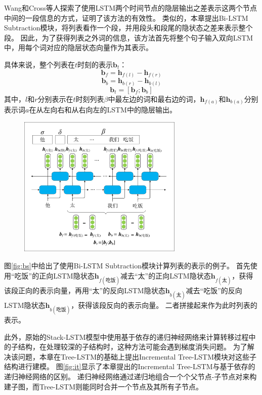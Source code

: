 Wang和Cross等人探索了使用LSTM两个时间节点的隐层输出之差表示这两个节点中间的一段信息的方式，证明了该方法的有效性。\cite{wang-chang-2016-graph,cross-huang-2016-span}
类似的，本章提出Bi-LSTM Subtraction模块，将列表看作一个段，并用段头和段尾的隐状态之差来表示整个段。
因此，为了获得列表之外词的信息，该方法首先将整个句子输入双向LSTM中，用每个词对应的隐层状态向量作为其表示。

具体来说，整个列表在$t$时刻的表示$\bm{b}_t$：
\begin{equation}
	\bm{b}_f=\bm{h}_{f(l)}-\bm{h}_{f(r)}
\end{equation}
\begin{equation}
	\bm{b}_b=\bm{h}_{b(r)}-\bm{h}_{b(l)}
\end{equation}
\begin{equation}
	\bm{b}_t=[\bm{b}_f ; \bm{b}_b]
\end{equation}
其中，$l$和$r$分别表示在$t$时刻列表$\beta$中最左边的词和最右边的词，$\bm{h}_{f(a)}$和$\bm{h}_{b(a)}$分别表示词$a$在从左向右和从右向左的LSTM中的隐层输出。

\begin{figure}[hbtp]
	\centering
	\includegraphics[width=0.7\textwidth]{figures/bs.pdf}
\end{figure}

图\ref{fig:bs}中给出了使用Bi-LSTM Subtraction模块计算列表的表示的例子。
首先使用“吃饭”的正向LSTM隐状态$\bm{h}_{f(\text{吃饭})}$减去“太”的正向LSTM隐状态$\bm{h}_{f(\text{太})}$，获得该段正向的表示向量，再用“太”的反向LSTM隐状态$\bm{h}_{b(\text{太})}$减去“吃饭”的反向LSTM隐状态$\bm{h}_{b(\text{吃饭})}$，获得该段反向的表示向量。
二者拼接起来作为此时列表的表示。

此外，原始的Stack-LSTM模型中使用基于依存的递归神经网络来计算转移过程中的子结构，在处理较深的子结构时，这种方法可能会遇到梯度消失问题。
为了解决该问题，本章在Tree-LSTM的基础上提出Incremental Tree-LSTM模块对这些子结构进行建模。
图\ref{fig:it}显示了本章提出的Incremental Tree-LSTM与基于依存的递归神经网络的区别。
递归神经网络通过递归地组合一个个父节点-子节点对来构建子图，而Tree-LSTM则能同时合并一个节点及其所有子节点。


